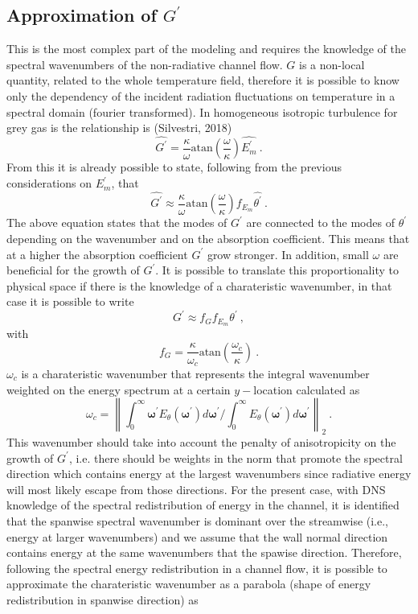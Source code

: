 \documentclass[10pt]{article}
\newcommand{\norm}[1]{\left\lVert#1\right\rVert}
\def\lp{\left(}
\def\rp{\right)}
\def\tr{{\theta^\prime}}
\begin{document}
\subsection*{Approximation of $G^\prime$}
This is the most complex part of the modeling and requires the knowledge of the spectral wavenumbers of the non-radiative channel flow. $G$ is a non-local quantity, related to the whole temperature field, therefore it is possible to know only the dependency of the incident radiation fluctuations on temperature in a spectral domain (fourier transformed). In homogeneous isotropic turbulence for grey gas is the relationship is (Silvestri, 2018)
\begin{equation*}
\widehat{G^\prime} = \frac{\kappa}{\omega} \text{atan}\lp\frac{\omega}{\kappa} \rp \widehat{E_m^\prime} \ .
\end{equation*} 
From this it is already possible to state, following from the previous considerations on $E_m^\prime$, that
\begin{equation*}
\widehat{G^\prime} \approx \frac{\kappa}{\omega} \text{atan}\lp\frac{\omega}{\kappa} \rp f_{E_m} \widehat{\tr} \ .
\end{equation*}
The above equation states that the modes of $G^\prime$ are connected to the modes of $\tr$ depending on the wavenumber and on the absorption coefficient. This means that at a higher the absorption coefficient $G^\prime$ grow stronger. In addition, small $\omega$ are beneficial for the growth of $G^\prime$. It is possible to translate this proportionality to physical space if there is the knowledge of a charateristic wavenumber, in that case it is possible to write
\begin{equation*}
G^\prime \approx f_G f_{E_m} \theta^\prime \ ,
\end{equation*}
with 
\begin{equation*}
f_G = \frac{\kappa}{\omega_c} \text{atan}\lp\frac{\omega_c}{\kappa} \rp \ .
\end{equation*}
$\omega_c$ is a charateristic wavenumber that represents the integral wavenumber weighted on the energy spectrum at a certain $y-$location calculated as
\begin{equation*}
\omega_c = {\norm{\int_{0}^{\infty} \boldsymbol{\omega^\prime} E_{\theta}(\boldsymbol{\omega^\prime}) d \boldsymbol{\omega^\prime} / \int_0^{\infty} E_{\theta}(\boldsymbol{\omega^\prime}) d \boldsymbol{\omega^\prime}}}_2 \ .
\end{equation*}
This wavenumber should take into account the penalty of anisotropicity on the growth of $G^\prime$, i.e. there should be weights in the norm that promote the spectral direction which contains energy at the largest wavenumbers since radiative energy will most likely escape from those directions. For the present case, with DNS knowledge of the spectral redistribution of energy in the channel, it is identified that the spanwise spectral wavenumber is dominant over the streamwise (i.e., energy at larger wavenumbers) and we assume that the wall normal direction contains energy at the same wavenumbers that the spawise direction. Therefore, following the spectral energy redistribution in a channel flow, it is possible to approximate the charateristic wavenumber as a parabola (shape of energy redistribution in spanwise direction) as
\end{document}
